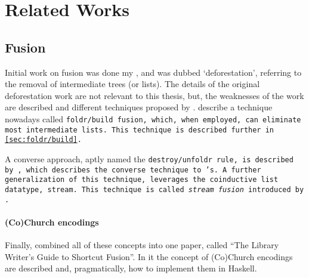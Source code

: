 \section{Related Works}\label{sec:related}

\subsection{Fusion}
Initial work on fusion was done my \cite{Wadler1984,Wadler1986,Wadler1990}, and was dubbed `deforestation', referring to the removal of intermediate trees (or lists).
The details of the original deforestation work are not relevant to this thesis, but, the weaknesses of the work are described and different techniques proposed by \cite{Gill1993}.
\cite{Gill1993} describe a technique nowadays called \tt{foldr/build} fusion, which, when employed, can eliminate most intermediate lists.
This technique is described further in \autoref{sec:foldr/build}.

A converse approach, aptly named the \tt{destroy/unfoldr} rule, is described by \cite{Svenningsson2002}, which describes the converse technique to \cite{Gill1993}'s.
A further generalization of this technique, leverages the coinductive list datatype, stream. This technique is called \textit{stream fusion} introduced by \cite{Coutts2007}.

\paragraph{(Co)Church encodings}
Finally, \cite{Harper2011} combined all of these concepts into one paper, called ``The Library Writer's Guide to Shortcut Fusion''. In it the concept of (Co)Church encodings are described and, pragmatically, how to implement them in Haskell.